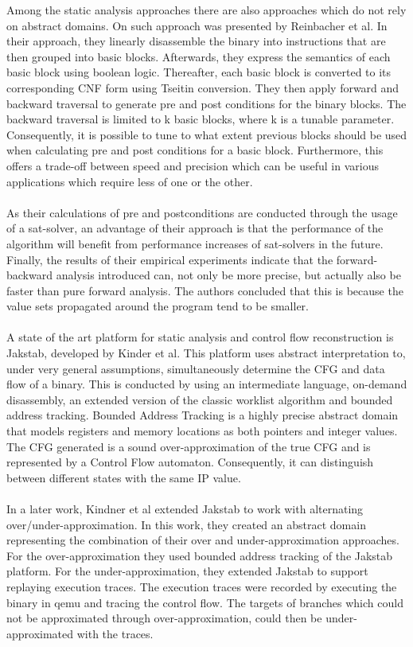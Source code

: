 \documentclass{kththesis}
\begin{document}
Among the static analysis approaches there are also approaches which do not rely on abstract domains. On such approach was presented by Reinbacher et al. In their approach, they linearly disassemble the binary into instructions that are then grouped into basic blocks. Afterwards, they express the semantics of each basic block using boolean logic. Thereafter, each basic block is converted to its corresponding CNF form using Tseitin conversion. They then apply forward and backward traversal to generate pre and post conditions for the binary blocks. The backward traversal is limited to k basic blocks, where k is a tunable parameter. Consequently, it is possible to tune to what extent previous blocks should be used when calculating pre and post conditions for a basic block. Furthermore, this offers a trade-off between speed and precision which can be useful in various applications which require less of one or the other.
\\ \\
As their calculations of pre and postconditions are conducted through the usage of a sat-solver, an advantage of their approach is that the performance of the algorithm will benefit from performance increases of sat-solvers in the future. Finally, the results of their empirical experiments indicate that the forward-backward analysis introduced can, not only be more precise, but actually also be faster than pure forward analysis. The authors concluded that this is because the value sets propagated around the program tend to be smaller.
\\ \\
A state of the art platform for static analysis and control flow reconstruction is Jakstab\cite{JakstabGit}, developed by Kinder et al\cite{Jakstab}. This platform uses abstract interpretation to, under very general assumptions, simultaneously determine the CFG and data flow of a binary. This is conducted by using an intermediate language, on-demand disassembly, an extended version of the classic worklist algorithm and bounded address tracking. Bounded Address Tracking is a highly precise abstract domain that models registers and memory locations as both pointers and integer values. The CFG generated is a sound over-approximation of the true CFG and is represented by a Control Flow automaton. Consequently, it can distinguish between different states with the same IP value.
\\ \\
In a later work, Kindner et al extended Jakstab to work with alternating over/under-approximation\cite{alternating}. In this work, they created an abstract domain representing the combination of their over and under-approximation approaches. For the over-approximation they used bounded address tracking of the Jakstab platform. For the under-approximation, they extended Jakstab to support replaying execution traces. The execution traces were recorded by executing the binary in qemu and tracing the control flow. The targets of branches which could not be approximated through over-approximation, could then be under-approximated with the traces. 
\end{document}
